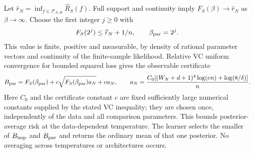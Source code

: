 Let $\widehat r_N=\inf_{f\in\mathcal F_{N,H}}\widehat R_S(f)$. Full support and continuity imply $F_S(\beta)\to\widehat r_N$ as $\beta\to\infty$. Choose the first integer $j\ge0$ with
\[
 F_S(2^j)\le\widehat r_N+1/n,
 \qquad\beta_{\rm par}=2^j.
\]
This value is finite, positive and measurable, by density of rational parameter vectors and continuity of the finite-sample likelihood. Relative VC uniform convergence for bounded squared loss gives the observable certificate
\[
 B_{\rm par}=F_S(\beta_{\rm par})+
       c\sqrt{F_S(\beta_{\rm par})a_N}+ca_N,
 \qquad a_N=\frac{C_0[(W_N+d+1)^4\log(en)+\log(8/\delta)]}{n}.
\]
Here $C_0$ and the certificate constant $c$ are fixed sufficiently large numerical constants supplied by the stated VC inequality; they are chosen once, independently of the data and all comparison parameters. This bounds posterior-average risk at the data-dependent temperature. The learner selects the smaller of $B_{\rm imp}$ and $B_{\rm par}$ and returns the ordinary mean of that one posterior. No averaging across temperatures or architectures occurs.

